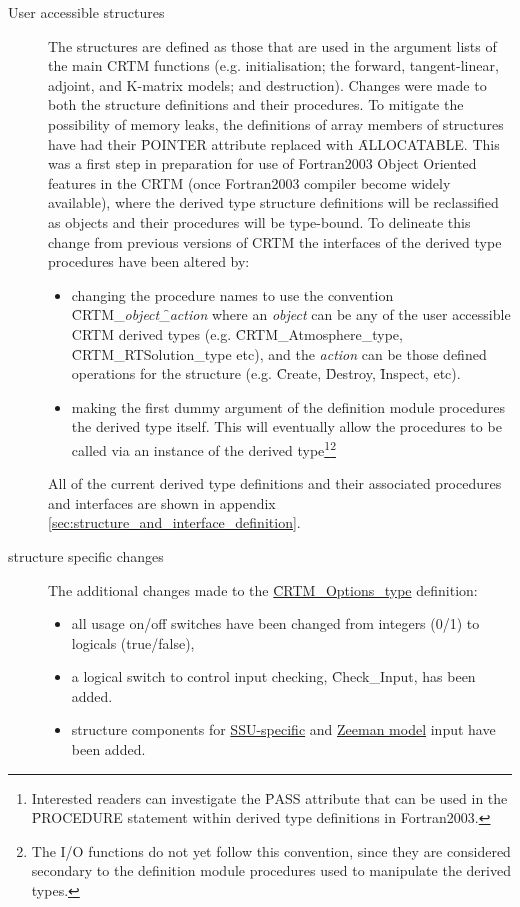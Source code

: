 \begin{description}
\item[User accessible structures] The structures are defined as those that are used in the argument lists of the main CRTM functions (e.g. initialisation; the forward, tangent-linear, adjoint, and K-matrix models; and destruction). Changes were made to both the structure definitions and their procedures. To mitigate the possibility of memory leaks, the definitions of array members of structures have had their \f{POINTER} attribute replaced with \f{ALLOCATABLE}. This was a first step in preparation for use of Fortran2003 Object Oriented features in the CRTM (once Fortran2003 compiler become widely available), where the derived type structure definitions will be reclassified as objects and their procedures will be type-bound. To delineate this change from previous versions of CRTM the interfaces of the derived type procedures have been altered by:
  \begin{itemize}
  \item changing the procedure names to use the convention \f{CRTM\_}\textit{object}\f{\_}\textit{action} where an \textit{object} can be any of the user accessible CRTM derived types (e.g. \f{CRTM\_Atmosphere\_type}, \f{CRTM\_RTSolution\_type} etc), and the \textit{action} can be those defined operations for the structure (e.g. \f{Create}, \f{Destroy}, \f{Inspect}, etc).
  \item making the first dummy argument of the definition module procedures the derived type itself. This will eventually allow the procedures to be called via an instance of the derived type\footnote{Interested readers can investigate the \f{PASS} attribute that can be used in the \f{PROCEDURE} statement within derived type definitions in Fortran2003.}\footnote{The I/O functions do not yet follow this convention, since they are considered secondary to the definition module procedures used to manipulate the derived types.}
  \end{itemize}
  All of the current derived type definitions and their associated procedures and interfaces are shown in appendix \ref{sec:structure_and_interface_definition}.

\item[\Options{} structure specific changes] The additional changes made to the \hyperref[sec:options_structure]{\f{CRTM\_Options\_type}} definition:
  \begin{itemize}
  \item all usage on/off switches have been changed from integers (0/1) to logicals (true/false),
  \item a logical switch to control input checking, \f{Check\_Input}, has been added.
  \item structure components for \hyperref[sec:ssu_input_structure]{SSU-specific} and \hyperref[sec:zeeman_input_structure]{Zeeman model} input have been added.
  \end{itemize}
\end{description}
